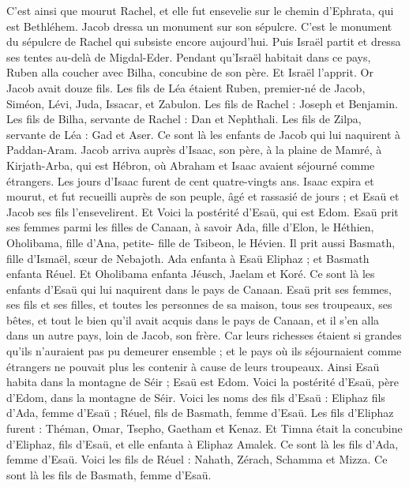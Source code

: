 \begin{multicols}{2}
C'est ainsi que mourut Rachel, et elle fut ensevelie sur le chemin d'Ephrata, qui est Bethléhem.
Jacob dressa un monument sur son sépulcre. C'est le monument du sépulcre de Rachel qui subsiste encore aujourd'hui.
Puis Israël partit et dressa ses tentes au-delà de Migdal-Eder.
Pendant qu’Israël habitait dans ce pays, Ruben alla coucher avec Bilha, concubine de son père.  Et Israël l'apprit. Or Jacob avait douze fils.
Les fils de Léa étaient Ruben, premier-né de Jacob, Siméon, Lévi, Juda, Issacar, et Zabulon.
Les fils de Rachel : Joseph et Benjamin.
Les fils de Bilha, servante de Rachel : Dan et Nephthali.
Les fils de Zilpa, servante de Léa : Gad et Aser. Ce sont là les enfants de Jacob qui lui naquirent à Paddan-Aram.
Jacob arriva auprès d’Isaac, son père, à la plaine de Mamré, à Kirjath-Arba, qui est Hébron, où Abraham et Isaac avaient séjourné comme étrangers.
Les jours d’Isaac furent de cent quatre-vingts ans.
Isaac expira et mourut, et fut recueilli auprès de son peuple, âgé et rassasié de jours ; et Esaü et Jacob ses fils l'ensevelirent.
\VerseOne{}Et Voici la postérité d'Esaü, qui est Edom.
Esaü prit ses femmes parmi les filles de Canaan, à savoir Ada, fille d'Elon, le Héthien, Oholibama, fille d’Ana, petite- fille de Tsibeon, le Hévien.
Il prit aussi Basmath, fille d'Ismaël, sœur de Nebajoth.
Ada enfanta à Esaü Eliphaz ; et Basmath enfanta Réuel.
Et Oholibama enfanta Jéusch, Jaelam et Koré. Ce sont là les enfants d'Esaü qui lui naquirent dans le  pays de Canaan.
Esaü prit ses femmes, ses fils et ses filles, et toutes les personnes de sa maison, tous ses troupeaux, ses bêtes, et tout le bien qu'il avait acquis dans le pays de Canaan, et il s'en alla dans un autre pays, loin de Jacob, son frère.
Car leurs richesses étaient si grandes qu'ils n'auraient pas pu demeurer ensemble ; et le pays où ils séjournaient comme étrangers ne pouvait plus les contenir à cause de leurs troupeaux.
Ainsi Esaü habita dans la montagne de Séir ; Esaü est Edom.
Voici la postérité d'Esaü, père d'Edom, dans la montagne de Séir.
Voici les noms des fils d'Esaü : Eliphaz fils d’Ada, femme d'Esaü ; Réuel, fils de Basmath, femme d'Esaü.
Les fils d'Eliphaz furent : Théman, Omar, Tsepho, Gaetham et Kenaz.
Et Timna était la concubine d'Eliphaz, fils d'Esaü, et elle enfanta à Eliphaz Amalek. Ce sont là les fils d’Ada, femme d'Esaü.
Voici les fils de Réuel : Nahath, Zérach, Schamma et Mizza. Ce sont là les fils de Basmath, femme d'Esaü.

\end{multicols}
